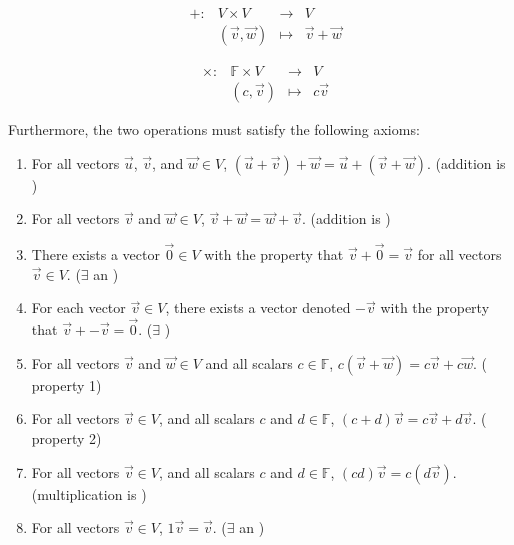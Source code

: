 \documentclass[11pt,fleqn]{book} %
\begin{document}
\begin{minipage}[t]{0.45\linewidth}
    $$\begin{matrix} &+: &V\times V  &\to &V \\& &(\vec{v},\vec{w}) &\mapsto &\vec{v}+\vec{w} \end{matrix}$$
\end{minipage}
\begin{minipage}[t]{0.45\linewidth}
    $$\begin{matrix} &\times: &\mathbb{F}\times V  &\to &V \\& &(c,\vec{v}) &\mapsto &c\vec{v} \end{matrix}$$
\end{minipage}

Furthermore, the two operations must satisfy the following axioms:

\begin{enumerate}[label=(\arabic*)]
    \item For all vectors $\vec{u}$, $\vec{v}$, and $\vec{w} \in V$, $(\vec{u} + \vec{v}) + \vec{w} = \vec{u} + (\vec{v} + \vec{w})$. (addition is )

    \item For all vectors $\vec{v}$ and $\vec{w} \in V$, $\vec{v} + \vec{w} = \vec{w} + \vec{v}$. (addition is )

    \item There exists a vector $\vec{0} \in V$ with the property that $\vec{v} + \vec{0} = \vec{v}$ for all vectors $\vec{v} \in V$. ($\exists$ an )

    \item For each vector $\vec{v} \in V$, there exists a vector denoted $-\vec{v}$ with the property that $\vec{v} + -\vec{v} = \vec{0}$. ($\exists$ )

    \item For all vectors $\vec{v}$ and $\vec{w} \in V$  and all scalars $c \in \mathbb{F}$, $c(\vec{v}+ \vec{w}) = c\vec{v} + c\vec{w}$. ( property 1)

    \item For all vectors $\vec{v} \in V$, and all scalars $c$ and $d \in \mathbb{F}$, $(c + d)\vec{v} = c\vec{v} + d\vec{v}$. ( property 2)

    \item For all vectors $\vec{v} \in V$, and all scalars $c$ and $d \in \mathbb{F}$, $(cd)\vec{v} = c(d\vec{v})$. (multiplication is )

    \item For all vectors $\vec{v} \in V$, $1\vec{v} = \vec{v}$. ($\exists$ an )
\end{enumerate}
\end{document}
